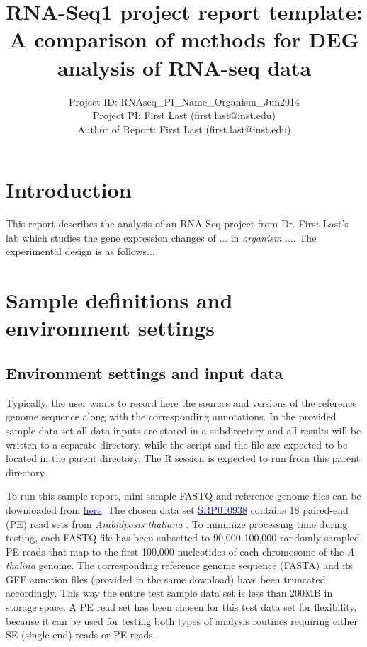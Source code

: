 \documentclass{article}
\begin{document}

\title{RNA-Seq1 project report template: A comparison of methods for DEG analysis of RNA-seq data}
\author{Project ID: RNAseq\_PI\_Name\_Organism\_Jun2014 \\
	Project PI: First Last (first.last@inst.edu)\\
        Author of Report: First Last (first.last@inst.edu)}
\maketitle

\tableofcontents

\section{Introduction}
This report describes the analysis of an RNA-Seq project from Dr. First Last's lab which studies the gene expression changes of ... in \textit{organism} .... The experimental design is as follows...

\section{Sample definitions and environment settings}

\subsection{Environment settings and input data}
Typically, the user wants to record here the sources and versions of the reference genome sequence along with the corresponding annotations. In the provided sample data set all data inputs are stored in a  subdirectory and all results will be written to a separate  directory, while the  script and the  file are expected to be located in the parent directory. The R session is expected to run from this parent directory.

To run this sample report, mini sample FASTQ and reference genome files can be downloaded from \href{http://biocluster.ucr.edu/~tgirke/projects/systemPipeR_test_data.zip}{\textcolor{blue}{here}}. The chosen data set \href{http://www.ncbi.nlm.nih.gov/sra/?term=SRP010938}{\textcolor{blue}{SRP010938}} contains 18 paired-end (PE) read sets from \textit{Arabidposis thaliana} \citep{Howard2013-fq}. To minimize processing time during testing, each FASTQ file has been subsetted to 90,000-100,000 randomly sampled PE reads that map to the first 100,000 nucleotides of each chromosome of the \textit{A. thalina} genome. The corresponding reference genome sequence (FASTA) and its GFF annotion files (provided in the same download) have been truncated accordingly. This way the entire test sample data set is less than 200MB in storage space. A PE read set has been chosen for this test data set for flexibility, because it can be used for testing both types of analysis routines requiring either SE (single end) reads or PE reads. 
\end{document}
